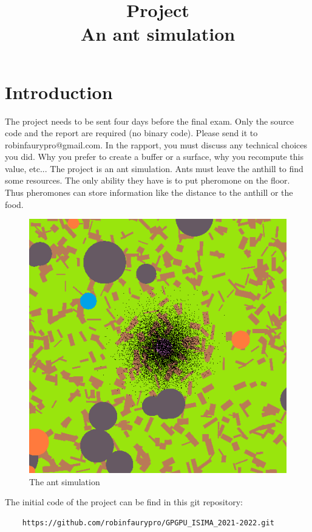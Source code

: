 \documentclass{article}
\begin{document}
\title{Project\\An ant simulation}
\maketitle

\section{Introduction}
The project needs to be sent four days before the final exam. Only the source code and the report are required (no binary code). Please send it to robinfaurypro@gmail.com. In the rapport, you must discuss any technical choices you did. Why you prefer to create a buffer or a surface, why you recompute this value, etc...
The project is an ant simulation. Ants must leave the anthill to find some resources. The only ability they have is to put pheromone on the floor. Thus pheromones can store information like the distance to the anthill or the food.
\begin{figure}[H]
	\centering
	\includegraphics[scale=0.8]{figures/ant.png}
	\caption{The ant simulation}
\end{figure}

The initial code of the project can be find in this git repository:
\begin{lstlisting}
	https://github.com/robinfaurypro/GPGPU_ISIMA_2021-2022.git
\end{lstlisting}
\end{document}
